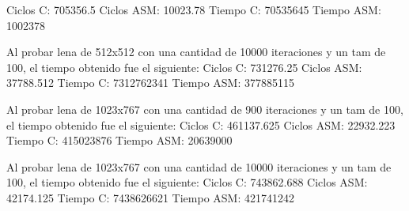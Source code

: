 \documentclass[10pt, a4paper]{article}
\begin{document}
\begin{itemize}
Ciclos C:                 705356.5\newline
Ciclos ASM:               10023.78\newline
\newline
Tiempo C:                 70535645\newline
Tiempo ASM:               1002378\newline
\newline




Al probar lena de 512x512 con una cantidad de 10000 iteraciones y un tam de 100, el tiempo obtenido fue el siguiente:\newline
Ciclos C:                 731276.25\newline
Ciclos ASM:               37788.512\newline
\newline
Tiempo C:                 7312762341\newline
Tiempo ASM:               377885115\newline
\newline

Al probar lena de 1023x767 con una cantidad de 900 iteraciones y un tam de 100, el tiempo obtenido fue el siguiente:\newline
Ciclos C:                 461137.625\newline
Ciclos ASM:               22932.223\newline
\newline
Tiempo C:                 415023876\newline
Tiempo ASM:               20639000\newline
\newline

Al probar lena de 1023x767 con una cantidad de 10000 iteraciones y un tam de 100, el tiempo obtenido fue el siguiente:\newline
Ciclos C:                 743862.688\newline
Ciclos ASM:               42174.125\newline
\newline
Tiempo C:                 7438626621\newline
Tiempo ASM:               421741242\newline





\end{itemize}
\end{document}
